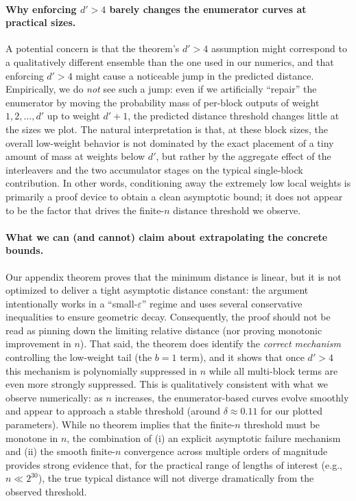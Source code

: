 \paragraph{Why enforcing $d'>4$ barely changes the enumerator curves at practical sizes.}
A potential concern is that the theorem’s $d'>4$ assumption might correspond to a qualitatively different
ensemble than the one used in our numerics, and that enforcing $d'>4$ might cause a noticeable jump in the
predicted distance. Empirically, we do \emph{not} see such a jump: even if we artificially ``repair'' the
enumerator by moving the probability mass of per-block outputs of weight $1,2,\ldots,d'$ up to weight $d'+1$,
the predicted distance threshold changes little at the sizes we plot.
The natural interpretation is that, at these block sizes, the overall low-weight behavior is not dominated
by the exact placement of a tiny amount of mass at weights below $d'$, but rather by the aggregate effect
of the interleavers and the two accumulator stages on the typical single-block contribution. In other words,
conditioning away the extremely low local weights is primarily a proof device to obtain a clean asymptotic
bound; it does not appear to be the factor that drives the finite-$n$ distance threshold we observe.

\paragraph{What we can (and cannot) claim about extrapolating the concrete bounds.}
Our appendix theorem proves that the minimum distance is linear, but it is not optimized to deliver a tight
asymptotic distance constant: the argument intentionally works in a ``small-$\varepsilon$'' regime and uses
several conservative inequalities to ensure geometric decay. Consequently, the proof should not be read as
pinning down the limiting relative distance (nor proving monotonic improvement in $n$).
That said, the theorem does identify the \emph{correct mechanism} controlling the low-weight tail (the $b=1$
term), and it shows that once $d'>4$ this mechanism is polynomially suppressed in $n$ while all multi-block
terms are even more strongly suppressed. This is qualitatively consistent with what we observe numerically:
as $n$ increases, the enumerator-based curves evolve smoothly and appear to approach a stable threshold
(around $\delta\approx 0.11$ for our plotted parameters). While no theorem implies that the finite-$n$ threshold
must be monotone in $n$, the combination of (i) an explicit asymptotic failure mechanism and (ii) the smooth
finite-$n$ convergence across multiple orders of magnitude provides strong evidence that, for the practical
range of lengths of interest (e.g., $n\ll 2^{30}$), the true typical distance will not diverge dramatically
from the observed threshold.

